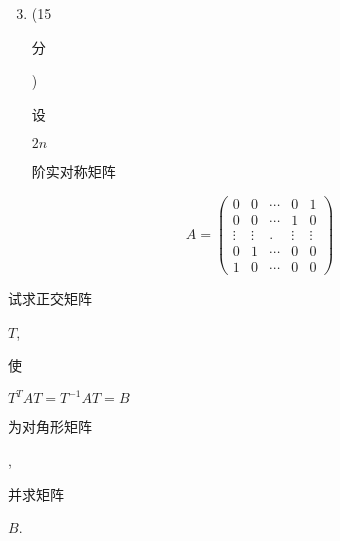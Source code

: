 \documentclass[10pt]{article}
\begin{document}
\begin{enumerate}
  \setcounter{enumi}{2}
  \item (15 \begin{CJK}{UTF8}{mj}分\end{CJK}) \begin{CJK}{UTF8}{mj}设\end{CJK} $2 n$ \begin{CJK}{UTF8}{mj}阶实对称矩阵\end{CJK}
\end{enumerate}
$$
A=\left(\begin{array}{ccccc}
0 & 0 & \cdots & 0 & 1 \\
0 & 0 & \cdots & 1 & 0 \\
\vdots & \vdots & . & \vdots & \vdots \\
0 & 1 & \cdots & 0 & 0 \\
1 & 0 & \cdots & 0 & 0
\end{array}\right)
$$
\begin{CJK}{UTF8}{mj}试求正交矩阵\end{CJK} $T$, \begin{CJK}{UTF8}{mj}使\end{CJK} $T^{T} A T=T^{-1} A T=B$ \begin{CJK}{UTF8}{mj}为对角形矩阵\end{CJK}, \begin{CJK}{UTF8}{mj}并求矩阵\end{CJK} $B$.
\end{document}
